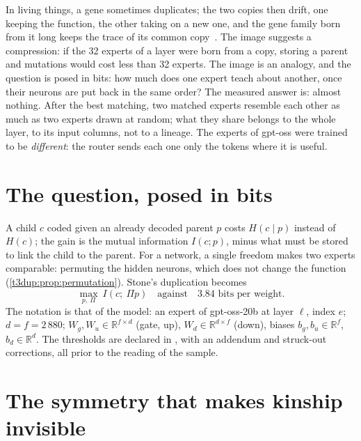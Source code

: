 \begin{enbref}
In living things, a gene sometimes duplicates; the two copies then drift, one keeping the function, the other taking on a new one, and the gene family born from it long keeps the trace of its common copy~\cite{ohno1970}. The image suggests a compression: if the 32 experts of a layer were born from a copy, storing a parent and mutations would cost less than 32 experts. The image is an analogy, and the question is posed in bits: how much does one expert teach about another, once their neurons are put back in the same order? The measured answer is: almost nothing. After the best matching, two matched experts resemble each other as much as two experts drawn at random; what they share belongs to the whole layer, to its input columns, not to a lineage. The experts of gpt-oss were trained to be \emph{different}: the router sends each one only the tokens where it is useful.
\end{enbref}

\section{The question, posed in bits}\label{t3dup:sec:question}

A child $c$ coded given an already decoded parent $p$ costs $H(c \mid p)$ instead of $H(c)$; the gain is the mutual information $I(c ; p)$, minus what must be stored to link the child to the parent. For a network, a single freedom makes two experts comparable: permuting the hidden neurons, which does not change the function (\cref{t3dup:prop:permutation}). Stone's duplication becomes
\begin{equation}\label{t3dup:eq:question}
\max_{p,\ \Pi}\ I(c ;\ \Pi p) \quad \text{against} \quad 3.84 \text{ bits per weight.}
\end{equation}
The notation is that of the model: an expert of gpt-oss-20b at layer $\ell$, index $e$; $d = f = 2\,880$; $W_g, W_u \in \mathbb{R}^{f \times d}$ (gate, up), $W_d \in \mathbb{R}^{d \times f}$ (down), biases $b_g, b_u \in \mathbb{R}^f$, $b_d \in \mathbb{R}^d$. The thresholds are declared in , with an addendum and struck-out corrections, all prior to the reading of the sample.

\section{The symmetry that makes kinship invisible}\label{t3dup:sec:symetrie}

